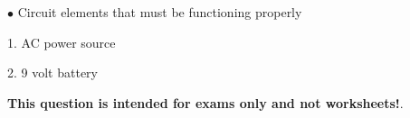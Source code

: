 \medskip
\item{$\bullet$} Circuit elements that must be functioning properly
\item{1.} AC power source
\item{2.} 9 volt battery
\medskip







{\bf This question is intended for exams only and not worksheets!}.




